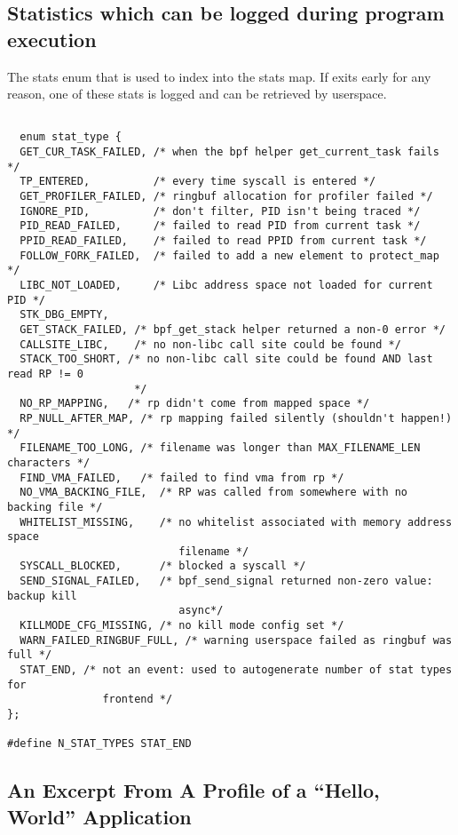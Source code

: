 \subsection{Statistics which can be logged during \af program execution}
\begin{listing}[H]
    \caption{The stats enum that is used to index into the stats map. If
    \af exits early for any reason, one of these stats is logged and can be
  retrieved by userspace.}\label{lst:stat-enum}
  \begin{verbatim}

  enum stat_type {
  GET_CUR_TASK_FAILED, /* when the bpf helper get_current_task fails */
  TP_ENTERED,          /* every time syscall is entered */
  GET_PROFILER_FAILED, /* ringbuf allocation for profiler failed */
  IGNORE_PID,          /* don't filter, PID isn't being traced */
  PID_READ_FAILED,     /* failed to read PID from current task */
  PPID_READ_FAILED,    /* failed to read PPID from current task */
  FOLLOW_FORK_FAILED,  /* failed to add a new element to protect_map */
  LIBC_NOT_LOADED,     /* Libc address space not loaded for current PID */
  STK_DBG_EMPTY,
  GET_STACK_FAILED, /* bpf_get_stack helper returned a non-0 error */
  CALLSITE_LIBC,    /* no non-libc call site could be found */
  STACK_TOO_SHORT, /* no non-libc call site could be found AND last read RP != 0
                    */
  NO_RP_MAPPING,   /* rp didn't come from mapped space */
  RP_NULL_AFTER_MAP, /* rp mapping failed silently (shouldn't happen!) */
  FILENAME_TOO_LONG, /* filename was longer than MAX_FILENAME_LEN characters */
  FIND_VMA_FAILED,   /* failed to find vma from rp */
  NO_VMA_BACKING_FILE,  /* RP was called from somewhere with no backing file */
  WHITELIST_MISSING,    /* no whitelist associated with memory address space
                           filename */
  SYSCALL_BLOCKED,      /* blocked a syscall */
  SEND_SIGNAL_FAILED,   /* bpf_send_signal returned non-zero value: backup kill
                           async*/
  KILLMODE_CFG_MISSING, /* no kill mode config set */
  WARN_FAILED_RINGBUF_FULL, /* warning userspace failed as ringbuf was full */
  STAT_END, /* not an event: used to autogenerate number of stat types for
               frontend */
};

#define N_STAT_TYPES STAT_END

\end{verbatim}
\end{listing}

\subsection{An Excerpt From A Profile of a ``Hello, World'' Application}

